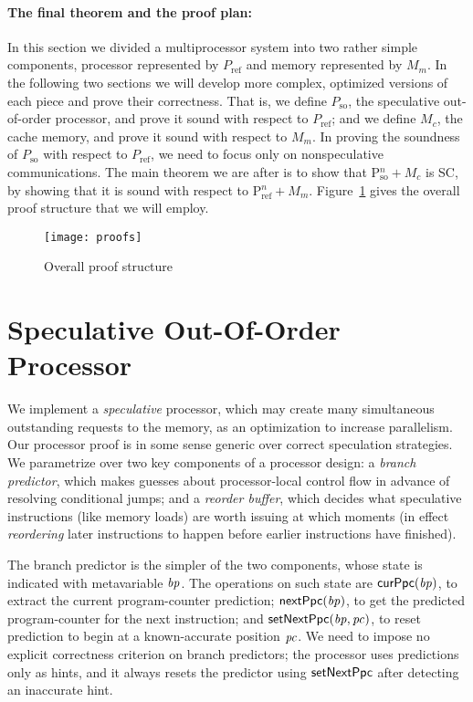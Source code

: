 \paragraph{The final theorem and the proof plan:} 
In this section we divided a multiprocessor system into two rather simple
components, processor represented by $P_\text{ref}$ and memory represented by
$M_m$. In the following two sections we will develop more complex, optimized
versions of each piece and prove their correctness.  That is, we define $P_\text{so}$, the
speculative out-of-order processor, and prove it sound with respect to $P_\text{ref}$;
and we define $M_c$, the cache memory, and prove it sound with respect to $M_m$. In proving the
soundness of $P_\text{so}$ with respect to $P_\text{ref}$, we need to focus
only on nonspeculative communications. The main theorem we are after is to
show that P$^n_\text{so}+ M_c$ is SC, by showing that it is sound with respect
to P$^n_\text{ref}+ M_m$. Figure~\ref{proofs} gives the overall proof structure
that we will employ.


\begin{figure}
\texttt{[image: proofs]}
\caption{Overall proof structure}
\label{proofs}
\end{figure}


\section{Speculative Out-Of-Order Processor}\label{sec:ooo}

We implement a \emph{speculative} processor, which may create many
simultaneous outstanding requests to the memory, as an optimization to
increase parallelism.  Our processor proof is in some sense generic
over correct speculation strategies.  We parametrize over two key
components of a processor design: a \emph{branch predictor}, which
makes guesses about processor-local control flow in advance of
resolving conditional jumps; and a
\emph{reorder buffer}, which decides what speculative instructions (like memory loads)
are worth issuing at which moments (in effect \emph{reordering} later
instructions to happen before earlier instructions have finished).

The branch predictor is the simpler of the two components, whose state
is indicated with metavariable $\mathit{bp}$.
The operations on such state are $\mathsf{curPpc}(\mathit{bp})$, to extract the
current program-counter prediction; $\mathsf{nextPpc}(\mathit{bp})$, to get the predicted
program-counter for the next instruction; and $\mathsf{setNextPpc}(\mathit{bp}, \mathit{pc})$,
to reset prediction to begin at a known-accurate position $\mathit{pc}$. We need to impose no explicit correctness criterion on
branch predictors; the processor uses predictions only as hints, and
it always resets the predictor using $\mathsf{setNextPpc}$ after detecting an
inaccurate hint.

